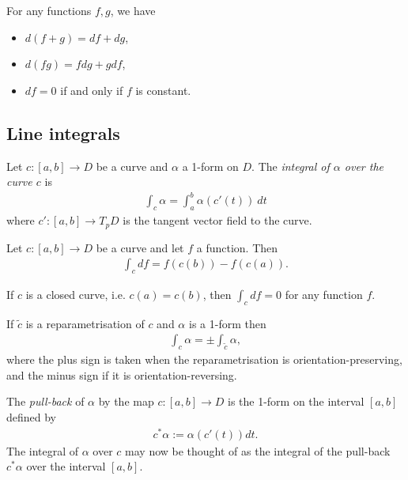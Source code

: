 \documentclass{article}
\begin{document}
\begin{proposition}[Notes 4.20]
	For any functions $f,g$, we have
	\begin{itemize}
		\item $d(f+g)=df + dg$,
		\item $d(fg) =fdg + gdf$,
		\item $df=0$ if and only if $f$ is constant.
	\end{itemize}
\end{proposition}

\subsection{Line integrals}

\begin{definition}
	Let $c:[a,b]\to D$ be a curve and $\alpha$ a 1-form on $D$. The \emph{integral
		of $\alpha$ over the curve $c$} is
	\begin{align*}
		\int_c \alpha = \int_a^b \alpha(c'(t))\:dt
	\end{align*}
	where $c':[a,b]\to T_pD$ is the tangent vector field to the curve.
\end{definition}

\begin{proposition}[Notes 4.22]
	Let $c:[a,b]\to D$ be a curve and let $f$ a function. Then
	\begin{align*}
		\int_c df = f(c(b)) - f(c(a)).
	\end{align*}
\end{proposition}

\begin{corollary}
	If $c$ is a closed curve, i.e. $c(a)=c(b)$, then $\int_c df = 0$ for any function $f$.
\end{corollary}

\begin{proposition}
	If $\tilde c$ is a reparametrisation of $c$ and $\alpha$ is a 1-form then
	\begin{align*}
		\int_c \alpha = \pm \int_{\tilde c} \alpha,
	\end{align*}
	where the plus sign is taken when the reparametrisation is orientation-preserving,
	and the minus sign if it is orientation-reversing.
\end{proposition}

\begin{definition}
	The \emph{pull-back} of $\alpha$ by the map $c:[a,b]\to D$ is the 1-form on the
	interval $[a,b]$ defined by
	\begin{align*}
		c^*\alpha :=  \alpha(c'(t))dt.
	\end{align*}
	The integral of $\alpha$ over $c$ may now be thought of as the integral of the pull-back
	$c^*\alpha$ over the interval $[a,b]$.
\end{definition}
\end{document}
